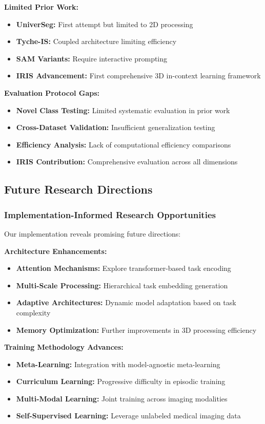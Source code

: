 \textbf{Limited Prior Work:}
\begin{itemize}
    \item \textbf{UniverSeg:} First attempt but limited to 2D processing
    \item \textbf{Tyche-IS:} Coupled architecture limiting efficiency
    \item \textbf{SAM Variants:} Require interactive prompting
    \item \textbf{IRIS Advancement:} First comprehensive 3D in-context learning framework
\end{itemize}

\textbf{Evaluation Protocol Gaps:}
\begin{itemize}
    \item \textbf{Novel Class Testing:} Limited systematic evaluation in prior work
    \item \textbf{Cross-Dataset Validation:} Insufficient generalization testing
    \item \textbf{Efficiency Analysis:} Lack of computational efficiency comparisons
    \item \textbf{IRIS Contribution:} Comprehensive evaluation across all dimensions
\end{itemize}

\subsection{Future Research Directions}

\subsubsection*{Implementation-Informed Research Opportunities}
Our implementation reveals promising future directions:

\textbf{Architecture Enhancements:}
\begin{itemize}
    \item \textbf{Attention Mechanisms:} Explore transformer-based task encoding
    \item \textbf{Multi-Scale Processing:} Hierarchical task embedding generation
    \item \textbf{Adaptive Architectures:} Dynamic model adaptation based on task complexity
    \item \textbf{Memory Optimization:} Further improvements in 3D processing efficiency
\end{itemize}

\textbf{Training Methodology Advances:}
\begin{itemize}
    \item \textbf{Meta-Learning:} Integration with model-agnostic meta-learning
    \item \textbf{Curriculum Learning:} Progressive difficulty in episodic training
    \item \textbf{Multi-Modal Learning:} Joint training across imaging modalities
    \item \textbf{Self-Supervised Learning:} Leverage unlabeled medical imaging data
\end{itemize}

